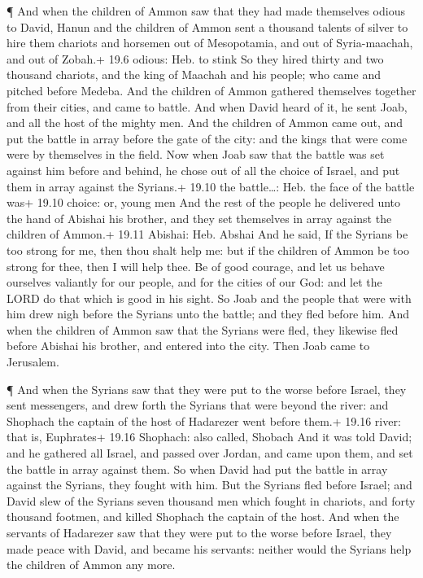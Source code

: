  ¶ And when the children of Ammon saw that they had made
themselves odious to David, Hanun and the children of Ammon sent a
thousand talents of silver to hire them chariots and horsemen out of
Mesopotamia, and out of Syria-maachah, and out of Zobah.+ 19.6 odious:
Heb. to stink  So they hired thirty and two thousand
chariots, and the king of Maachah and his people; who came and pitched
before Medeba. And the children of Ammon gathered themselves together
from their cities, and came to battle.  And when David heard
of it, he sent Joab, and all the host of the mighty men. 
And the children of Ammon came out, and put the battle in array before
the gate of the city: and the kings that were come were by themselves in
the field.  Now when Joab saw that the battle was set
against him before and behind, he chose out of all the choice of Israel,
and put them in array against the Syrians.+ 19.10 the battle\ldots: Heb.
the face of the battle was+ 19.10 choice: or, young men 
And the rest of the people he delivered unto the hand of Abishai his
brother, and they set themselves in array against the children of
Ammon.+ 19.11 Abishai: Heb. Abshai  And he said, If the
Syrians be too strong for me, then thou shalt help me: but if the
children of Ammon be too strong for thee, then I will help thee.
 Be of good courage, and let us behave ourselves valiantly
for our people, and for the cities of our God: and let the LORD do that
which is good in his sight.  So Joab and the people that
were with him drew nigh before the Syrians unto the battle; and they
fled before him.  And when the children of Ammon saw that
the Syrians were fled, they likewise fled before Abishai his brother,
and entered into the city. Then Joab came to Jerusalem.

 ¶ And when the Syrians saw that they were put to the worse
before Israel, they sent messengers, and drew forth the Syrians that
were beyond the river: and Shophach the captain of the host of Hadarezer
went before them.+ 19.16 river: that is, Euphrates+ 19.16 Shophach: also
called, Shobach  And it was told David; and he gathered all
Israel, and passed over Jordan, and came upon them, and set the battle
in array against them. So when David had put the battle in array against
the Syrians, they fought with him.  But the Syrians fled
before Israel; and David slew of the Syrians seven thousand men which
fought in chariots, and forty thousand footmen, and killed Shophach the
captain of the host.  And when the servants of Hadarezer
saw that they were put to the worse before Israel, they made peace with
David, and became his servants: neither would the Syrians help the
children of Ammon any more.

